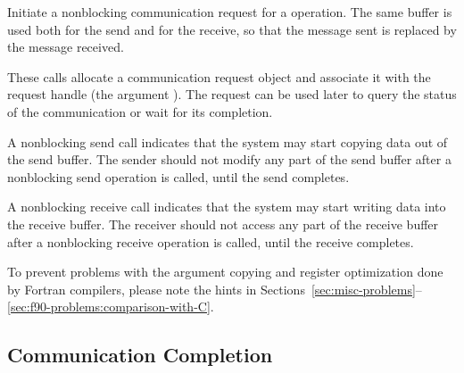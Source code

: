 Initiate a nonblocking communication request for a  operation.
The same buffer is used both for the send and for the receive, so that the
message sent is replaced by the message received.

These calls allocate a communication
request object and associate it with the request handle (the argument
).
The request can be used later to
query the status of the communication or wait for its completion.

A nonblocking send call indicates that the
system may start copying data out of the send buffer.
The sender should not
modify
any part of the send
buffer after a nonblocking send operation is called, until the send completes.

A nonblocking receive call indicates that the system may start
writing data into the receive buffer.  The receiver should not access
any part of the
receive buffer after a nonblocking receive operation is called,
until the receive completes.

\begin{users}
  To prevent problems with the argument copying and register optimization done
  by Fortran compilers, please note the hints in
Sections~\ref{sec:misc-problems}--\ref{sec:f90-problems:comparison-with-C}.
\end{users}


\subsection{Communication Completion}
\label{subsec:pt2pt-commend}

